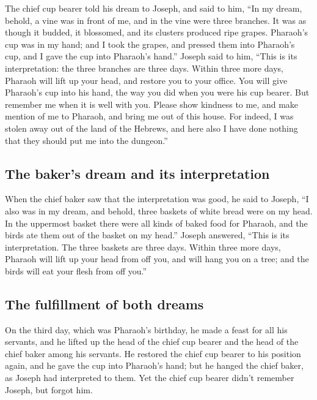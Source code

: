  The chief cup bearer told his dream to Joseph, and said
to him, ``In my dream, behold, a vine was in front of me,
 and in the vine were three branches. It was as though it
budded, it blossomed, and its clusters produced ripe grapes.
 Pharaoh's cup was in my hand; and I took the grapes, and
pressed them into Pharaoh's cup, and I gave the cup into Pharaoh's
hand.''  Joseph said to him, ``This is its
interpretation: the three branches are three days. 
Within three more days, Pharaoh will lift up your head, and restore you
to your office. You will give Pharaoh's cup into his hand, the way you
did when you were his cup bearer.  But remember me when
it is well with you. Please show kindness to me, and make mention of me
to Pharaoh, and bring me out of this house.  For indeed,
I was stolen away out of the land of the Hebrews, and here also I have
done nothing that they should put me into the dungeon.''

\hypertarget{the-bakers-dream-and-its-interpretation}{%
\subsection{The baker's dream and its
interpretation}\label{the-bakers-dream-and-its-interpretation}}

 When the chief baker saw that the interpretation was
good, he said to Joseph, ``I also was in my dream, and behold, three
baskets of white bread were on my head.  In the uppermost
basket there were all kinds of baked food for Pharaoh, and the birds ate
them out of the basket on my head.''  Joseph answered,
``This is its interpretation. The three baskets are three days.
 Within three more days, Pharaoh will lift up your head
from off you, and will hang you on a tree; and the birds will eat your
flesh from off you.''

\hypertarget{the-fulfillment-of-both-dreams}{%
\subsection{The fulfillment of both
dreams}\label{the-fulfillment-of-both-dreams}}

 On the third day, which was Pharaoh's birthday, he made
a feast for all his servants, and he lifted up the head of the chief cup
bearer and the head of the chief baker among his servants.
 He restored the chief cup bearer to his position again,
and he gave the cup into Pharaoh's hand;  but he hanged
the chief baker, as Joseph had interpreted to them.  Yet
the chief cup bearer didn't remember Joseph, but forgot him.

